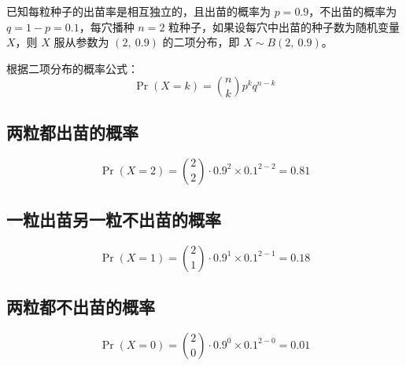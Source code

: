 \documentclass{article}
\begin{document}
已知每粒种子的出苗率是相互独立的，且出苗的概率为 $p=0.9$，不出苗的概率为 $q=1-p=0.1$，每穴播种 $n=2$ 粒种子，如果设每穴中出苗的种子数为随机变量 $X$，则 $X$ 服从参数为 $(2,\ 0.9)$ 的二项分布，即 $X\sim B(2,\ 0.9)$。

根据二项分布的概率公式：
\[ \Pr(X=k)=\binom{n}{k}p^{k}q^{n-k} \]



\subsection{两粒都出苗的概率}
\[ \Pr(X=2)=\binom{2}{2}\cdot0.9^{2}\times0.1^{2-2}=0.81 \]



\subsection{一粒出苗另一粒不出苗的概率}
\[ \Pr(X=1)=\binom{2}{1}\cdot0.9^{1}\times0.1^{2-1}=0.18 \]



\subsection{两粒都不出苗的概率}
\[ \Pr(X=0)=\binom{2}{0}\cdot0.9^{0}\times0.1^{2-0}=0.01 \]
\end{document}
